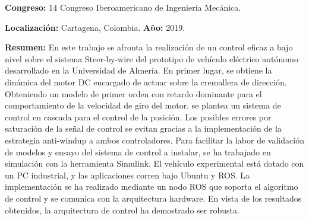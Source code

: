 \textbf{Congreso:} 14 Congreso Iberoamericano de Ingeniería Mecánica.

\textbf{Localización:} Cartagena, Colombia. \textbf{Año:} 2019. 

\textbf{Resumen:} En este trabajo se afronta la realización de un control eficaz a bajo nivel sobre el sistema Steer-by-wire del prototipo de vehículo eléctrico autónomo desarrollado en la Universidad de Almería. En primer lugar, se obtiene la dinámica del motor DC encargado de actuar sobre la cremallera de dirección. Obteniendo un modelo de primer orden con retardo dominante para el comportamiento de la velocidad de giro del motor, se plantea un sistema de control en cascada para el control de la posición. Los posibles errores por saturación de la señal de control se evitan gracias a la implementación de la estrategia anti-windup a ambos controladores. Para facilitar la labor de validación de modelos y ensayo del sistema de control a instalar, se ha trabajado en simulación con la herramienta Simulink. El vehículo experimental está dotado con un PC industrial, y las aplicaciones corren bajo Ubuntu y ROS. La implementación se ha realizado mediante un nodo ROS que soporta el algoritmo de control y se comunica con la arquitectura hardware. En vista de los resultados obtenidos, la arquitectura de control ha demostrado ser robusta.

\afterpage{\blankpage}